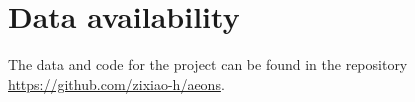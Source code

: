 \documentclass[usenatbib]{mnras} %
\begin{document}
\section*{Data availability}
The data and code for the project can be found in the repository \url{https://github.com/zixiao-h/aeons}.





\label{lastpage}
\end{document}
